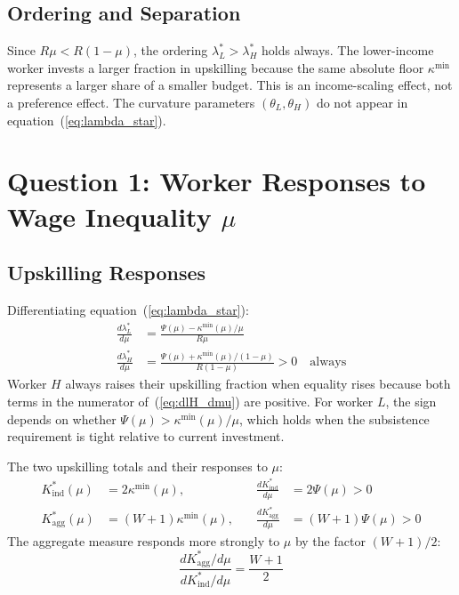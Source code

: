 \documentclass[12pt,a4paper]{article}
\begin{document}
\subsection{Ordering and Separation}

Since $R\mu < R(1-\mu)$, the ordering $\lambda_L^* > \lambda_H^*$
holds always. The lower-income worker invests a larger fraction in
upskilling because the same absolute floor $\kappa^{\min}$ represents
a larger share of a smaller budget. This is an income-scaling effect,
not a preference effect. The curvature parameters $(\theta_L, \theta_H)$
do not appear in equation~(\ref{eq:lambda_star}).

\section{Question 1: Worker Responses to Wage Inequality $\mu$}
\label{sec:workers}

\subsection{Upskilling Responses}

Differentiating equation~(\ref{eq:lambda_star}):
\begin{align}
  \frac{d\lambda_L^*}{d\mu}
  &= \frac{\Psi(\mu) - \kappa^{\min}(\mu)/\mu}{R\mu}
  \label{eq:dlL_dmu} \\[4pt]
  \frac{d\lambda_H^*}{d\mu}
  &= \frac{\Psi(\mu) + \kappa^{\min}(\mu)/(1-\mu)}{R(1-\mu)}
  > 0 \quad \text{always}
  \label{eq:dlH_dmu}
\end{align}
Worker $H$ always raises their upskilling fraction when equality rises
because both terms in the numerator of~(\ref{eq:dlH_dmu}) are positive.
For worker $L$, the sign depends on whether $\Psi(\mu) >
\kappa^{\min}(\mu)/\mu$, which holds when the subsistence requirement
is tight relative to current investment.

The two upskilling totals and their responses to $\mu$:
\begin{align}
  K^*_{\mathrm{ind}}(\mu) &= 2\kappa^{\min}(\mu),
  &\quad \frac{dK^*_{\mathrm{ind}}}{d\mu} &= 2\Psi(\mu) > 0
  \label{eq:dK_ind} \\[4pt]
  K^*_{\mathrm{agg}}(\mu) &= (W+1)\kappa^{\min}(\mu),
  &\quad \frac{dK^*_{\mathrm{agg}}}{d\mu} &= (W+1)\Psi(\mu) > 0
  \label{eq:dK_agg}
\end{align}
The aggregate measure responds more strongly to $\mu$ by the factor
$(W+1)/2$:
\begin{equation}
  \frac{dK^*_{\mathrm{agg}}/d\mu}{dK^*_{\mathrm{ind}}/d\mu}
  = \frac{W+1}{2}
  \label{eq:K_ratio}
\end{equation}
\end{document}
